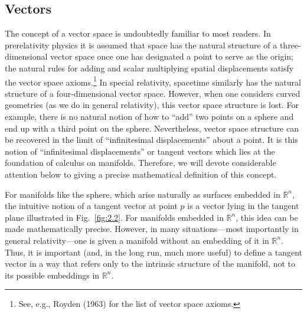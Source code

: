 
\subsection{Vectors}\label{sec:2.2}

The concept of a vector space is undoubtedly familiar to most readers.  In
prerelativity physics it is assumed that space has the natural structure of a
three-dimensional vector space once one has designated a point to serve as the
origin; the natural rules for adding and scalar multiplying spatial displacements
satisfy the vector space axioms.\footnote{See, e.g., Royden (1963) for the list of
vector space axioms.} In special relativity, spacetime similarly has the natural
structure of a four-dimensional vector space.  However, when one considers curved
geometries (as we do in general relativity), this vector space structure is lost.  For
example, there is no natural notion of how to ``add'' two points on a sphere and end
up with a third point on the sphere.  Nevertheless, vector space structure can be
recovered in the limit of ``infinitesimal displacements'' about a point.  It is this
notion of ``infinitesimal displacements'' or tangent vectors which lies at the
foundation of calculus on manifolds.  Therefore, we will devote considerable
attention below to giving a precise mathematical definition of this concept.



For manifolds like the sphere, which arise naturally as surfaces embedded in
\(\mathbb{R}^n\), the intuitive notion of a tangent vector at point \(p\) is a vector
lying in the tangent plane illustrated in Fig.~\ref{fig:2.2}.  For manifolds embedded
in \(\mathbb{R}^n\), this idea can be made mathematically precise.  However, in
many situations---most importantly in general relativity---one is given a manifold
without an embedding of it in \(\mathbb{R}^n\).  Thus, it is important (and, in the
long run, much more useful) to define a tangent vector in a way that refers only to
the intrinsic structure of the manifold, not to its possible embeddings in
\(\mathbb{R}^n\).

